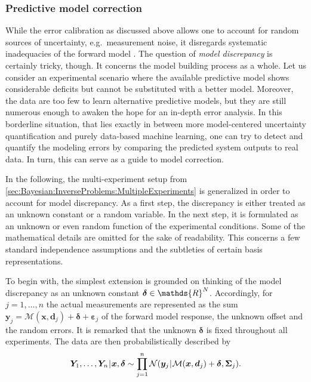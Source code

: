 \subsubsection{Predictive model correction}
While the error calibration as discussed above allows one to account for random sources of uncertainty, e.g.\ measurement noise,
it disregards systematic inadequacies of the forward model \cite{Bayesian:Ling2014,Bayesian:Sargsyan2015}.
The question of \emph{model discrepancy} is certainly tricky, though.
It concerns the model building process as a whole.
Let us consider an experimental scenario where the available predictive model shows considerable deficits but cannot be substituted with a better model.
Moreover, the data are too few to learn alternative predictive models, but they are still numerous enough to awaken the hope for an in-depth error analysis.
In this borderline situation, that lies exactly in between more model-centered uncertainty quantification and purely data-based machine learning,
one can try to detect and quantify the modeling errors by comparing the predicted system outputs to real data.
In turn, this can serve as a guide to model correction.
\par %
In the following, the multi-experiment setup from \cref{sec:Bayesian:InverseProblems:MultipleExperiments} is generalized in order to account for model discrepancy.
As a first step, the discrepancy is either treated as an unknown constant or a random variable.
In the next step, it is formulated as an unknown or even random function of the experimental conditions.
Some of the mathematical details are omitted for the sake of readability.
This concerns a few standard independence assumptions and the subtleties of certain basis representations.
\par %
To begin with, the simplest extension is grounded on thinking of the model discrepancy as an unknown constant \(\bm{\delta} \in \mathds{R}^\dimData\).
Accordingly, for \(j=1,\ldots,n\) the actual measurements are represented as the sum \(\bm{y}_j = \mathcal{M}(\bm{x},\bm{d}_j) + \bm{\delta} + \bm{\varepsilon}_j\)
of the forward model response, the unknown offset and the random errors.
It is remarked that the unknown \(\bm{\delta}\) is fixed throughout all experiments.
The data are then probabilistically described by
\begin{equation} \label{eq:Inversion:Model:UnknownConstantDiscrepancy}
  \bm{Y}_1,\ldots,\bm{Y}_n {\:\!}|{\:\!} \bm{x},\bm{\delta} \sim \prod\limits_{j=1}^n \mathcal{N}(\bm{y}_j {\:\!}|{\:\!} \mathcal{M}(\bm{x},\bm{d}_j) + \bm{\delta}, \bm{\Sigma}_j).
\end{equation}
